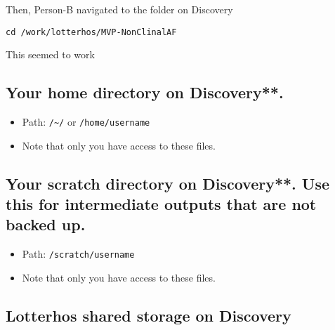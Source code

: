 \documentclass[
  letterpaper,
  DIV=11,
  numbers=noendperiod]{scrreprt}
\begin{document}
Then, Person-B navigated to the folder on Discovery

\begin{verbatim}
cd /work/lotterhos/MVP-NonClinalAF
\end{verbatim}

This seemed to work

\hypertarget{your-home-directory-on-discovery.}{%
\subsection*{\texorpdfstring{\textbf{Your home directory on
Discovery**.}}{Your home directory on Discovery**.}}\label{your-home-directory-on-discovery.}}

\begin{itemize}
\item
  Path: \texttt{/\textasciitilde{}/} or \texttt{/home/username}
\item
  Note that only you have access to these files.
\end{itemize}

\hypertarget{your-scratch-directory-on-discovery.-use-this-for-intermediate-outputs-that-are-not-backed-up.}{%
\subsection*{\texorpdfstring{\textbf{Your scratch directory on
Discovery**. Use this for intermediate outputs that are not backed
up.}}{Your scratch directory on Discovery**. Use this for intermediate outputs that are not backed up.}}\label{your-scratch-directory-on-discovery.-use-this-for-intermediate-outputs-that-are-not-backed-up.}}

\begin{itemize}
\item
  Path: \texttt{/scratch/username}
\item
  Note that only you have access to these files.
\end{itemize}

\hypertarget{lotterhos-shared-storage-on-discovery}{%
\subsection*{\texorpdfstring{\textbf{Lotterhos shared storage on
Discovery}}{Lotterhos shared storage on Discovery}}\label{lotterhos-shared-storage-on-discovery}}
\end{document}
